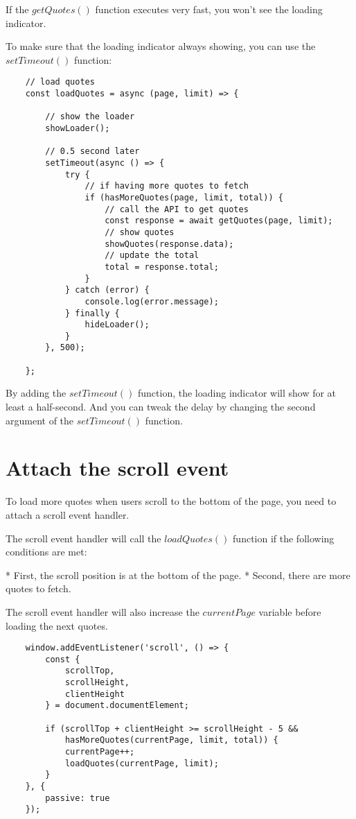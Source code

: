 \documentclass[11pt]{article}
\begin{document}
If the $getQuotes()$ function executes very fast,
you won't see the loading indicator.

To make sure that the loading indicator always showing,
you can use the $setTimeout()$ function:

\begin{lstlisting}
    // load quotes
    const loadQuotes = async (page, limit) => {

        // show the loader
        showLoader();

        // 0.5 second later
        setTimeout(async () => {
            try {
                // if having more quotes to fetch
                if (hasMoreQuotes(page, limit, total)) {
                    // call the API to get quotes
                    const response = await getQuotes(page, limit);
                    // show quotes
                    showQuotes(response.data);
                    // update the total
                    total = response.total;
                }
            } catch (error) {
                console.log(error.message);
            } finally {
                hideLoader();
            }
        }, 500);

    };
\end{lstlisting}

By adding the $setTimeout()$ function, the loading indicator will
show for at least a half-second. And you can tweak the delay by
changing the second argument of the $setTimeout()$ function.

\section*{Attach the scroll event}

To load more quotes when users scroll to the bottom of the page,
you need to attach a scroll event handler.

The scroll event handler will call the $loadQuotes()$ function
if the following conditions are met:

* First, the scroll position is at the bottom of the page.
* Second, there are more quotes to fetch.

The scroll event handler will also increase the $currentPage$
variable before loading the next quotes.

\begin{lstlisting}
    window.addEventListener('scroll', () => {
        const {
            scrollTop,
            scrollHeight,
            clientHeight
        } = document.documentElement;

        if (scrollTop + clientHeight >= scrollHeight - 5 &&
            hasMoreQuotes(currentPage, limit, total)) {
            currentPage++;
            loadQuotes(currentPage, limit);
        }
    }, {
        passive: true
    });
\end{lstlisting}
\end{document}
